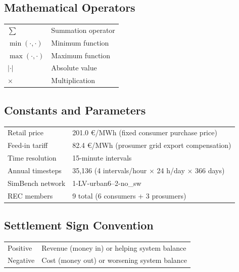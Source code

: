 \subsection{Mathematical Operators}

\begin{tabular}{ll}
$\sum$ & Summation operator \\
$\min(\cdot, \cdot)$ & Minimum function \\
$\max(\cdot, \cdot)$ & Maximum function \\
$|\cdot|$ & Absolute value \\
$\times$ & Multiplication \\
\end{tabular}

\subsection{Constants and Parameters}

\begin{tabular}{ll}
Retail price & 201.0 \euro/MWh (fixed consumer purchase price) \\
Feed-in tariff & 82.4 \euro/MWh (prosumer grid export compensation) \\
Time resolution & 15-minute intervals \\
Annual timesteps & 35,136 (4 intervals/hour $\times$ 24 h/day $\times$ 366 days) \\
SimBench network & 1-LV-urban6--2-no\_sw \\
REC members & 9 total (6 consumers + 3 prosumers) \\
\end{tabular}

\subsection{Settlement Sign Convention}

\begin{tabular}{ll}
Positive & Revenue (money in) or helping system balance \\
Negative & Cost (money out) or worsening system balance \\
\end{tabular}
